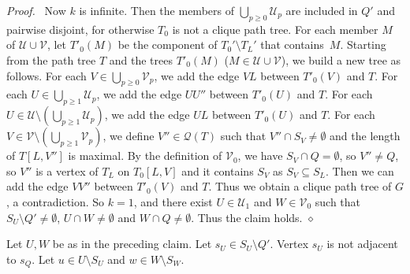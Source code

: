 \documentclass[11pt]{article}
\newenvironment{proofcl}{\noindent \emph{Proof.}\ }{Thus the claim
holds.  \hfill $\diamond$\vspace{1em}}
\begin{document}
\begin{proofcl}
Now $k$ is infinite.  Then the members of $\bigcup_{p\geq 0} \mathcal
U_p$ are included in $Q'$ and pairwise disjoint, for otherwise $T_0$
is not a clique path tree.  For each member $M$ of $\mathcal U\cup
\mathcal V$, let $T'_0(M)$ be the component of $T_0' \setminus T_L'$
that contains~$M$.  Starting from the path tree $T$ and the trees
$T'_0(M)$ ($M\in \mathcal U\cup \mathcal V$), we build a new tree as
follows.  For each $V\in \bigcup_{p\geq 0} \mathcal V_p$, we add the
edge $VL$ between $T'_0(V)$ and $T$.  For each $U\in \bigcup_{p\geq 1}
\mathcal U_p$, we add the edge $UU''$ between $T'_0(U)$ and $T$.  For
each $U\in \mathcal U\setminus (\bigcup_{p\geq 1} \mathcal U_p)$, we
add the edge $UL$ between $T'_0(U)$ and $T$.  For each $V\in \mathcal
V\setminus (\bigcup_{p\geq 1} \mathcal V_p)$, we define $V''\in
\mathcal Q(T)$ such that $V''\cap S_V\neq\emptyset$ and the length of
$T[L, V'']$ is maximal.  By the definition of $\mathcal V_0$, we have
$S_V\cap Q=\emptyset$, so $V''\neq Q$, so $V''$ is a vertex of $T_L$
on $T_0[{L, V}]$ and it contains $S_V$ as $S_V\subseteq S_L$.  Then we
can add the edge $VV''$ between $T'_0(V)$ and $T$.  Thus we obtain a
clique path tree of $G$, a contradiction.  So $k=1$, and there exist
$U\in \mathcal U_1$ and $W\in \mathcal V_0$ such that $S_U\setminus
Q'\neq\emptyset$, $U\cap W\neq\emptyset$ and $W\cap Q\neq\emptyset$.
\end{proofcl}


Let $U, W$ be as in the preceding claim.  Let $s_U\in S_U\setminus
Q'$.  Vertex $s_U$ is not adjacent to $s_Q$.  Let $u\in U\setminus
S_U$ and $w\in W\setminus S_W$.
\end{document}
